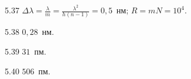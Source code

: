 \begin{Solution}{5.{37}}
        $\Delta\lambda = \frac{\lambda}{m} = \frac{\lambda^2}{h(n-1)} = 0,5$~нм; $R = mN = 10^4$.
    
\end{Solution}
\begin{Solution}{5.{38}}
        $0,28$~нм.
    
\end{Solution}
\begin{Solution}{5.{39}}
        $31$~пм.
    
\end{Solution}
\begin{Solution}{5.{40}}
        $506$~пм.
    
\end{Solution}
